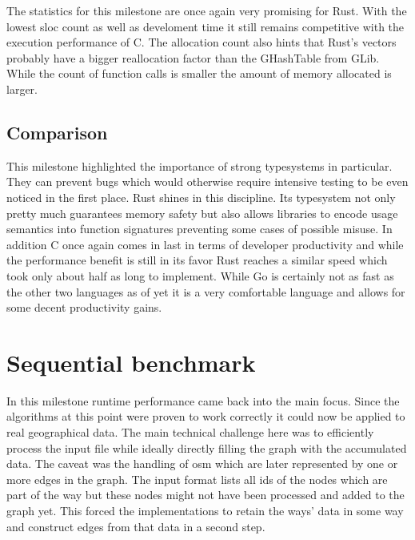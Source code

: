 The statistics for this milestone are once again very promising for Rust. With the lowest \gls{sloc} count as well as develoment time it still remains competitive with the execution performance of C. The allocation count also hints that Rust's vectors probably have a bigger reallocation factor than the GHashTable from GLib. While the count of function calls is smaller the amount of memory allocated is larger.

\subsection{Comparison}
\label{subsec:Implementation::Verification::Comparison}

This milestone highlighted the importance of strong typesystems in particular. They can prevent bugs which would otherwise require intensive testing to be even noticed in the first place. Rust shines in this discipline. Its typesystem not only pretty much guarantees memory safety but also allows libraries to encode usage semantics into function signatures preventing some cases of possible misuse. In addition C once again comes in last in terms of developer productivity and while the performance benefit is still in its favor Rust reaches a similar speed which took only about half as long to implement. While Go is certainly not as fast as the other two languages as of yet it is a very comfortable language and allows for some decent productivity gains.

\section{Sequential benchmark}
\label{sec:Implementation::SequentialBenchmark}

In this milestone runtime performance came back into the main focus. Since the algorithms at this point were proven to work correctly it could now be applied to real geographical data. The main technical challenge here was to efficiently process the input file while ideally directly filling the graph with the accumulated data. The caveat was the handling of \gls{osm}  which are later represented by one or more edges in the graph. The input format lists all ids of the nodes which are part of the way but these nodes might not have been processed and added to the graph yet. This forced the implementations to retain the ways' data in some way and construct edges from that data in a second step.

